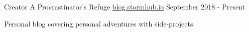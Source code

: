 
\begin{cventries}
  \cventry
    {Creator}
    {A Procrastinator's Refuge}
    {\href{https://blog.stormhub.io}{blog.stormhub.io}}
    {September 2018 - Present}
    {
      \begin{cvitems}
        \item {Personal blog covering personal adventures with side-projects.}
      \end{cvitems}
    }
\end{cventries}
